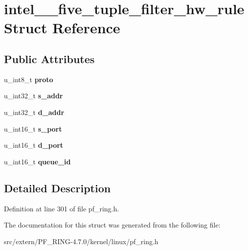 \hypertarget{structintel__82599__five__tuple__filter__hw__rule}{
\section{intel\_\_\-five\_\-tuple\_\-filter\_\-hw\_\-rule Struct Reference}
\label{structintel__82599__five__tuple__filter__hw__rule}
}
\subsection*{Public Attributes}
\begin{DoxyCompactItemize}
\item 
\hypertarget{structintel__82599__five__tuple__filter__hw__rule_a938939a4c2043069194366906a79b63f}{
u\_\-int8\_\-t {\bfseries proto}}
\label{structintel__82599__five__tuple__filter__hw__rule_a938939a4c2043069194366906a79b63f}

\item 
\hypertarget{structintel__82599__five__tuple__filter__hw__rule_a0f08628f0cd3f0a590aace658c7aa96a}{
u\_\-int32\_\-t {\bfseries s\_\-addr}}
\label{structintel__82599__five__tuple__filter__hw__rule_a0f08628f0cd3f0a590aace658c7aa96a}

\item 
\hypertarget{structintel__82599__five__tuple__filter__hw__rule_a3bc02f11043c71e639d5c4544947a0c7}{
u\_\-int32\_\-t {\bfseries d\_\-addr}}
\label{structintel__82599__five__tuple__filter__hw__rule_a3bc02f11043c71e639d5c4544947a0c7}

\item 
\hypertarget{structintel__82599__five__tuple__filter__hw__rule_a12fecc1f008f62613f678a2eab52d180}{
u\_\-int16\_\-t {\bfseries s\_\-port}}
\label{structintel__82599__five__tuple__filter__hw__rule_a12fecc1f008f62613f678a2eab52d180}

\item 
\hypertarget{structintel__82599__five__tuple__filter__hw__rule_af038b4a6c3f01930412db8863da2109b}{
u\_\-int16\_\-t {\bfseries d\_\-port}}
\label{structintel__82599__five__tuple__filter__hw__rule_af038b4a6c3f01930412db8863da2109b}

\item 
\hypertarget{structintel__82599__five__tuple__filter__hw__rule_a2e6877aa1d15f23b5cd1520edaf9488b}{
u\_\-int16\_\-t {\bfseries queue\_\-id}}
\label{structintel__82599__five__tuple__filter__hw__rule_a2e6877aa1d15f23b5cd1520edaf9488b}

\end{DoxyCompactItemize}


\subsection{Detailed Description}


Definition at line 301 of file pf\_\-ring.h.



The documentation for this struct was generated from the following file:\begin{DoxyCompactItemize}
\item 
src/extern/PF\_\-RING-\/4.7.0/kernel/linux/pf\_\-ring.h\end{DoxyCompactItemize}
